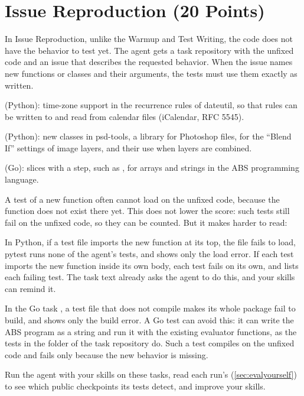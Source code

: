 \documentclass[letterpaper,11pt]{article}
\begin{document}
\section{Issue Reproduction (20 Points)}
\label{sec:ir}

In Issue Reproduction, unlike the Warmup and Test Writing, the code does not
have the behavior to test yet. The agent gets a task repository with the
unfixed code and an issue that describes the requested behavior. When the issue names new
functions or classes and their arguments, the tests must use them exactly as
written.

\squishlist
 \item {} (Python): time-zone support in the recurrence rules of
   dateutil, so that rules can be written to and read from calendar files
   (iCalendar, RFC 5545).
 \item {} (Python): new classes in psd-tools, a library for
   Photoshop files, for the ``Blend If'' settings of image layers, and their use when layers are combined.
 \item {} (Go): slices with a step, such as , for arrays and
   strings in the ABS programming language.
\squishend

A test of a new function often cannot load on the unfixed code, because the
function does not exist there yet. This does not lower the score: such tests
still fail on the unfixed code, so they can be counted. But it makes
 harder to read:
\squishlist
 \item In Python, if a test file imports the new function at its top, the
   file fails to load, pytest runs none of the agent's tests, and
    shows only the load error. If each test imports the new
   function inside its own body, each test fails on its own, and
    lists each failing test. The task text already asks the
   agent to do this, and your skills can remind it.
 \item In the Go task , a test file that does not compile makes its
   whole package fail to build, and  shows only the build
   error. A Go test can avoid this: it can write the ABS program as a string
   and run it with the existing evaluator functions, as the tests in the
    folder of the task repository do. Such a test compiles on
   the unfixed code and fails only because the new behavior is missing.
\squishend

Run the agent with your skills on these tasks, read each run's
 (\autoref{sec:evalyourself}) to see which public checkpoints its
tests detect, and improve your skills.
\end{document}
